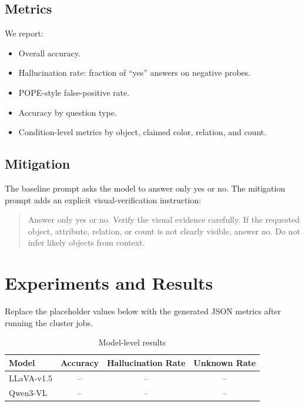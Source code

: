 \documentclass[11pt,a4paper]{article}
\begin{document}
\subsection{Metrics}

We report:

\begin{itemize}
    \item Overall accuracy.
    \item Hallucination rate: fraction of \enquote{yes} answers on negative probes.
    \item POPE-style false-positive rate.
    \item Accuracy by question type.
    \item Condition-level metrics by object, claimed color, relation, and count.
\end{itemize}

\subsection{Mitigation}

The baseline prompt asks the model to answer only yes or no. The mitigation prompt adds an explicit visual-verification instruction:

\begin{quote}
Answer only yes or no. Verify the visual evidence carefully. If the requested object, attribute, relation, or count is not clearly visible, answer no. Do not infer likely objects from context.
\end{quote}

\section{Experiments and Results}

Replace the placeholder values below with the generated JSON metrics after running the cluster jobs.

\begin{table}[h]
\centering
\caption{Model-level results}
\begin{tabular}{@{}lccc@{}}
\toprule
\textbf{Model} & \textbf{Accuracy} & \textbf{Hallucination Rate} & \textbf{Unknown Rate} \\
\midrule
LLaVA-v1.5 & -- & -- & -- \\
Qwen3-VL & -- & -- & -- \\
\bottomrule
\end{tabular}
\end{table}
\end{document}
